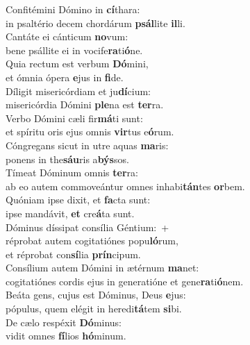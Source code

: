 \evenverse Confitémini Dómino in \textbf{cí}thara:~\*\\
\evenverse in psaltério decem chordárum \textbf{psál}lite \textbf{il}li.\\
\oddverse Cantáte ei cánticum \textbf{no}vum:~\*\\
\oddverse bene psállite ei in vocife\textbf{ra}ti\textbf{ó}ne.\\
\evenverse Quia rectum est verbum \textbf{Dó}mini,~\*\\
\evenverse et ómnia ópera \textbf{e}jus in \textbf{fi}de.\\
\oddverse Díligit misericórdiam et ju\textbf{dí}cium:~\*\\
\oddverse misericórdia Dómini \textbf{ple}na est \textbf{ter}ra.\\
\evenverse Verbo Dómini cæli fir\textbf{má}ti sunt:~\*\\
\evenverse et spíritu oris ejus omnis \textbf{vir}tus e\textbf{ó}rum.\\
\oddverse Cóngregans sicut in utre aquas \textbf{ma}ris:~\*\\
\oddverse ponens in the\textbf{sáu}ris a\textbf{býs}sos.\\
\evenverse Tímeat Dóminum omnis \textbf{ter}ra:~\*\\
\evenverse ab eo autem commoveántur omnes inhabi\textbf{tán}tes \textbf{or}bem.\\
\oddverse Quóniam ipse dixit, et \textbf{fa}cta sunt:~\*\\
\oddverse ipse mandávit, \textbf{et} cre\textbf{á}ta sunt.\\
\evenverse Dóminus díssipat consília Géntium:~+\\
\evenverse  réprobat autem cogitatiónes popu\textbf{ló}rum,~\*\\
\evenverse et réprobat con\textbf{sí}lia \textbf{prín}cipum.\\
\oddverse Consílium autem Dómini in ætérnum \textbf{ma}net:~\*\\
\oddverse cogitatiónes cordis ejus in generatióne et gene\textbf{ra}ti\textbf{ó}nem.\\
\evenverse Beáta gens, cujus est Dóminus, Deus \textbf{e}jus:~\*\\
\evenverse pópulus, quem elégit in heredi\textbf{tá}tem \textbf{si}bi.\\
\oddverse De cælo respéxit \textbf{Dó}minus:~\*\\
\oddverse vidit omnes \textbf{fí}lios \textbf{hó}minum.\\
